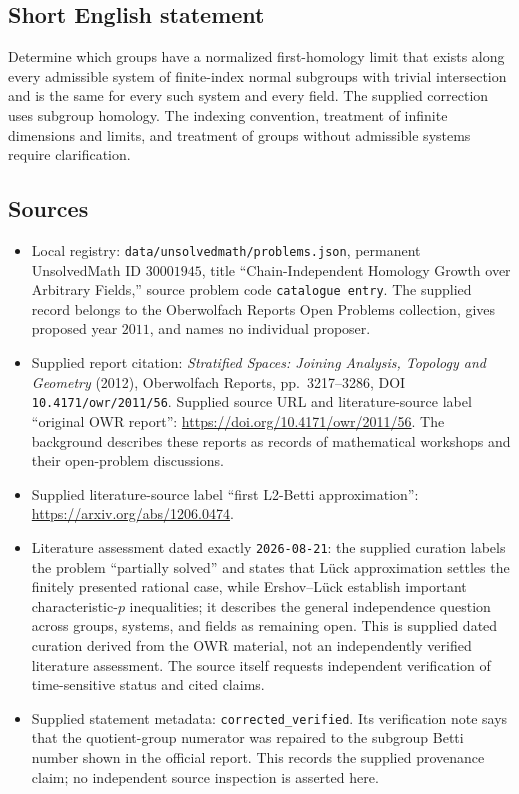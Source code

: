 \documentclass[11pt]{article}
\begin{document}
\subsection{Short English statement}
Determine which groups have a normalized first-homology limit that exists along every admissible system of finite-index normal subgroups with trivial intersection and is the same for every such system and every field. The supplied correction uses subgroup homology. The indexing convention, treatment of infinite dimensions and limits, and treatment of groups without admissible systems require clarification.
\subsection{Sources}
\begin{itemize}
\item Local registry: \texttt{data/unsolvedmath/problems.json}, permanent UnsolvedMath ID \(30001945\), title ``Chain-Independent Homology Growth over Arbitrary Fields,'' source problem code \texttt{catalogue entry}. The supplied record belongs to the Oberwolfach Reports Open Problems collection, gives proposed year \(2011\), and names no individual proposer.
\item Supplied report citation: \emph{Stratified Spaces: Joining Analysis, Topology and Geometry} (2012), Oberwolfach Reports, pp.\ 3217--3286, DOI \texttt{10.4171/owr/2011/56}. Supplied source URL and literature-source label ``original OWR report'': \url{https://doi.org/10.4171/owr/2011/56}. The background describes these reports as records of mathematical workshops and their open-problem discussions.
\item Supplied literature-source label ``first L2-Betti approximation'': \url{https://arxiv.org/abs/1206.0474}.
\item Literature assessment dated exactly \texttt{2026-08-21}: the supplied curation labels the problem ``partially solved'' and states that L\"uck approximation settles the finitely presented rational case, while Ershov--L\"uck establish important characteristic-\(p\) inequalities; it describes the general independence question across groups, systems, and fields as remaining open. This is supplied dated curation derived from the OWR material, not an independently verified literature assessment. The source itself requests independent verification of time-sensitive status and cited claims.
\item Supplied statement metadata: \texttt{corrected\_verified}. Its verification note says that the quotient-group numerator was repaired to the subgroup Betti number shown in the official report. This records the supplied provenance claim; no independent source inspection is asserted here.
\end{itemize}
\end{document}
